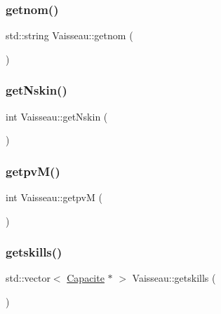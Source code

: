 \mbox{\label{class_vaisseau_acbe2e5af7beda381d21392d4eb539761}} 
\subsubsection{\texorpdfstring{getnom()}{getnom()}}
{\footnotesize\ttfamily std\+::string Vaisseau\+::getnom (\begin{DoxyParamCaption}{ }\end{DoxyParamCaption})}

\mbox{\label{class_vaisseau_aaecdafade1e84272e58cc97558f7c5c3}} 
\subsubsection{\texorpdfstring{get\+Nskin()}{getNskin()}}
{\footnotesize\ttfamily int Vaisseau\+::get\+Nskin (\begin{DoxyParamCaption}{ }\end{DoxyParamCaption})}

\mbox{\label{class_vaisseau_aac552ebb8c5b199c0f0e38b1f1cd95af}} 
\subsubsection{\texorpdfstring{getpv\+M()}{getpvM()}}
{\footnotesize\ttfamily int Vaisseau\+::getpvM (\begin{DoxyParamCaption}{ }\end{DoxyParamCaption})}

\mbox{\label{class_vaisseau_a40cb016e98f0f928b32b3b4a47e27599}} 
\subsubsection{\texorpdfstring{getskills()}{getskills()}}
{\footnotesize\ttfamily std\+::vector$<$ \hyperlink{class_capacite}{Capacite} $\ast$ $>$ Vaisseau\+::getskills (\begin{DoxyParamCaption}{ }\end{DoxyParamCaption})}

